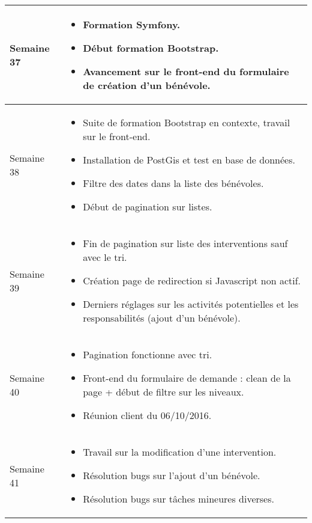 \documentclass [a4paper] {article}
\begin{document}
\section*{\Francois}

\centering
	\begin{longtable}{|>{\columncolor{gray!40}}p{2cm}|p{12cm}|}
	\hline
	Semaine 37 & \begin{itemize}
	\item Formation Symfony.
	\item Début formation Bootstrap.
	\item Avancement sur le front-end du formulaire de création d'un bénévole.
	\end{itemize}	 \\
	\hline
	
	Semaine 38 & \begin{itemize}
	\item Suite de formation Bootstrap en contexte, travail sur le front-end.
	\item Installation de PostGis et test en base de données.
	\item Filtre des dates dans la liste des bénévoles.
	\item Début de pagination sur listes.
\end{itemize}	 \\
	\hline
	
	Semaine 39 & \begin{itemize}
	\item Fin de pagination sur liste des interventions sauf avec le tri.
	\item Création page de redirection si Javascript non actif.
	\item Derniers réglages sur les activités potentielles et les responsabilités (ajout d'un bénévole).
\end{itemize}	 \\
	\hline
	
	Semaine 40 & \begin{itemize}
	\item Pagination fonctionne avec tri.
	\item Front-end du formulaire de demande : clean de la page + début de filtre sur les niveaux.
	\item Réunion client du 06/10/2016.
\end{itemize}	 \\
	\hline
	
	Semaine 41 & \begin{itemize}
	\item Travail sur la modification d'une intervention.
	\item Résolution bugs sur l'ajout d'un bénévole.
	\item Résolution bugs sur tâches mineures diverses.
\end{itemize}	 \\
	\hline
	

\end{longtable}
\end{document}
